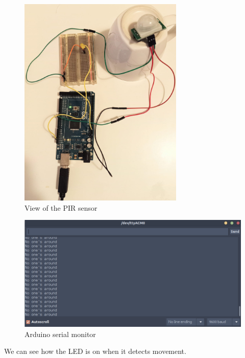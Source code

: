 \begin{figure}[H]
    \centering
    \includegraphics[width=0.7\textwidth]{fig/pir-off.jpeg}
    \caption{View of the PIR sensor}
    \label{fig:pir-off}
\end{figure}

\begin{figure}[H]
    \centering
    \includegraphics[width=1\textwidth]{fig/pir-no-one.png}
    \caption{Arduino serial monitor}
    \label{fig:pir-no-one}
\end{figure}

We can see how the LED is on when it detects movement.

